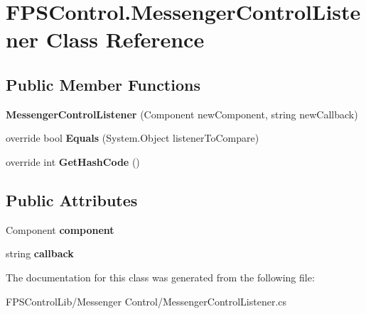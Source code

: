 \hypertarget{class_f_p_s_control_1_1_messenger_control_listener}{\section{F\-P\-S\-Control.\-Messenger\-Control\-Listener Class Reference}
\label{class_f_p_s_control_1_1_messenger_control_listener}
}
\subsection*{Public Member Functions}
\begin{DoxyCompactItemize}
\item 
\hypertarget{class_f_p_s_control_1_1_messenger_control_listener_a91ad52fb7a126ee9a925f0c99587e293}{{\bfseries Messenger\-Control\-Listener} (Component new\-Component, string new\-Callback)}\label{class_f_p_s_control_1_1_messenger_control_listener_a91ad52fb7a126ee9a925f0c99587e293}

\item 
\hypertarget{class_f_p_s_control_1_1_messenger_control_listener_a37fdd04e84d4c02a7eb2040e57e8eb91}{override bool {\bfseries Equals} (System.\-Object listener\-To\-Compare)}\label{class_f_p_s_control_1_1_messenger_control_listener_a37fdd04e84d4c02a7eb2040e57e8eb91}

\item 
\hypertarget{class_f_p_s_control_1_1_messenger_control_listener_a8b9c653f858c17db55d59ebb01625be9}{override int {\bfseries Get\-Hash\-Code} ()}\label{class_f_p_s_control_1_1_messenger_control_listener_a8b9c653f858c17db55d59ebb01625be9}

\end{DoxyCompactItemize}
\subsection*{Public Attributes}
\begin{DoxyCompactItemize}
\item 
\hypertarget{class_f_p_s_control_1_1_messenger_control_listener_a8572d2018ad944a22289ed3be91c31a6}{Component {\bfseries component}}\label{class_f_p_s_control_1_1_messenger_control_listener_a8572d2018ad944a22289ed3be91c31a6}

\item 
\hypertarget{class_f_p_s_control_1_1_messenger_control_listener_aa2f26bbcf86b1783d2b5b050ad326350}{string {\bfseries callback}}\label{class_f_p_s_control_1_1_messenger_control_listener_aa2f26bbcf86b1783d2b5b050ad326350}

\end{DoxyCompactItemize}


The documentation for this class was generated from the following file\-:\begin{DoxyCompactItemize}
\item 
F\-P\-S\-Control\-Lib/\-Messenger Control/Messenger\-Control\-Listener.\-cs\end{DoxyCompactItemize}
